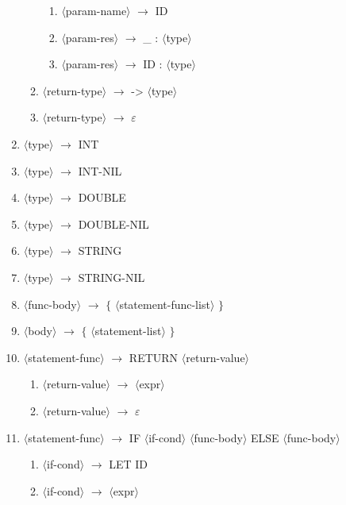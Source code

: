 \documentclass[11spt]{article}
\newcommand{\red}[1]{{\color{red} #1}}
\begin{document}
\begin{enumerate}
\begin{enumerate}
\begin{enumerate}
            \item $\langle$param-name$\rangle$ $\rightarrow$ \red{ID}
            \item $\langle$param-res$\rangle$ $\rightarrow$ \red{\_ :} $\langle$type$\rangle$
            \item $\langle$param-res$\rangle$ $\rightarrow$ \red{ID :} $\langle$type$\rangle$
        \end{enumerate}
        \item $\langle$return-type$\rangle$ $\rightarrow$ \red{->} $\langle$type$\rangle$
        \item $\langle$return-type$\rangle$ $\rightarrow$ \red{$\varepsilon$}
    \end{enumerate}
    \item $\langle$type$\rangle$ $\rightarrow$ \red{INT}
    \item $\langle$type$\rangle$ $\rightarrow$ \red{INT-NIL}
    \item $\langle$type$\rangle$ $\rightarrow$ \red{DOUBLE}
    \item $\langle$type$\rangle$ $\rightarrow$ \red{DOUBLE-NIL}
    \item $\langle$type$\rangle$ $\rightarrow$ \red{STRING}
    \item $\langle$type$\rangle$ $\rightarrow$ \red{STRING-NIL}
    \item $\langle$func-body$\rangle$ $\rightarrow$ \red{$\{$} $\langle$statement-func-list$\rangle$ \red{$\}$}
    \item $\langle$body$\rangle$ $\rightarrow$ \red{$\{$} $\langle$statement-list$\rangle$ \red{$\}$}
    \item $\langle$statement-func$\rangle$ $\rightarrow$ \red{RETURN} $\langle$return-value$\rangle$
    \begin{enumerate}
        \item $\langle$return-value$\rangle$ $\rightarrow$ $\langle$expr$\rangle$
        \item $\langle$return-value$\rangle$ $\rightarrow$ \red{$\varepsilon$}
    \end{enumerate}
    \item $\langle$statement-func$\rangle$ $\rightarrow$ \red{IF} $\langle$if-cond$\rangle$ $\langle$func-body$\rangle$ \red{ELSE} $\langle$func-body$\rangle$
    \begin{enumerate}
        \item $\langle$if-cond$\rangle$ $\rightarrow$ \red{LET ID}
        \item $\langle$if-cond$\rangle$ $\rightarrow$ $\langle$expr$\rangle$

\end{enumerate}
\end{enumerate}
\end{document}
